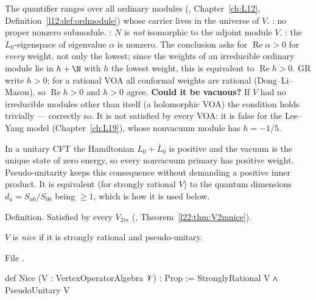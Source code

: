 \begin{dictionary}
The quantifier  ranges over all ordinary modules (, Chapter~\ref{ch:L12},
Definition~\ref{l12:def:ordmodule}) whose carrier lives in the universe of $V$. : no
proper nonzero submodule. : $N$ is \emph{not} isomorphic to
the adjoint module $V$. : the $L_0$-eigenspace of eigenvalue $\alpha$ is nonzero. The
conclusion asks for $\operatorname{Re}\alpha>0$ for \emph{every} weight, not only the lowest; since the
weights of an irreducible ordinary module lie in $h+\N$ with $h$ the lowest weight, this is equivalent to
$\operatorname{Re} h>0$. GR write $h>0$; for a rational VOA all conformal weights are rational (Dong--Li--Mason),
so $\operatorname{Re}h>0$ and $h>0$ agree. \textbf{Could it be vacuous?} If $V$ had no irreducible modules other
than itself (a holomorphic VOA) the condition holds trivially --- correctly so. It is not satisfied by every
VOA: it is false for the Lee--Yang model (Chapter~\ref{ch:L19}),
whose nonvacuum module has $h=-1/5$.
\end{dictionary}

\begin{physics}
In a unitary CFT the Hamiltonian $L_0+\bar L_0$ is positive and the vacuum is the unique state of zero
energy, so every nonvacuum primary has positive weight. Pseudo-unitarity keeps this consequence without
demanding a positive inner product. It is equivalent (for strongly rational $V$) to the quantum dimensions
$d_a = S_{a0}/S_{00}$ being $\ge1$, which is how it is used below.
\end{physics}

\begin{status}
Definition. Satisfied by every $V_{2m}$ (, Theorem~\ref{l22:thm:V2mnice}).
\end{status}

\begin{definition}\label{l22:def:nice}
$V$ is \emph{nice} if it is strongly rational and pseudo-unitary.
\end{definition}
\noindent File .
\begin{leancode}
def Nice (V : VertexOperatorAlgebra 𝒱) : Prop :=
  StronglyRational V ∧ PseudoUnitary V
\end{leancode}


